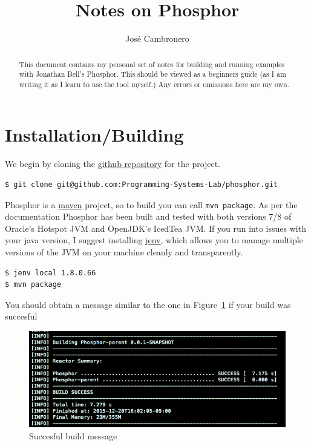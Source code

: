 \documentclass[a4paper]{article}
\title{Notes on Phosphor}
\author{Jos\'e Cambronero}
\begin{document}
\maketitle
\begin{abstract}
This document contains my personal set of notes for building and running examples with Jonathan Bell's
Phosphor\cite{bell2014phosphor}. This should be viewed as a beginners guide (as I am writing it
as I learn to use the tool myself.) Any errors or omissions here are my own.
\end{abstract}

\section{Installation/Building}
\label{install}
We begin by cloning the \href{https://github.com/Programming-Systems-Lab/phosphor}{github repository}
for the project.

\begin{lstlisting}
$ git clone git@github.com:Programming-Systems-Lab/phosphor.git
\end{lstlisting}

Phosphor is a \href{https://maven.apache.org/}{maven} project, so to build you can call
\verb|mvn package|. As per the documentation
Phosphor has been built and tested with both versions 7/8 of Oracle's Hotspot JVM and
OpenJDK's IcedTea JVM. If you run into issues with your java version, I suggest installing
\href{http://www.jenv.be/}{jenv}, which allows you to manage multiple versions of the JVM on your
machine cleanly and transparently.

\begin{lstlisting}
$ jenv local 1.8.0.66
$ mvn package
\end{lstlisting}

You should obtain a message similar to the one in Figure~\ref{fig:phosphor-build} if your build was succesful

\begin{figure}
\includegraphics[width=\textwidth]{figures/phosphor-build}
\caption{Succesful build message}
\label{fig:phosphor-build}
\end{figure}
\end{document}
